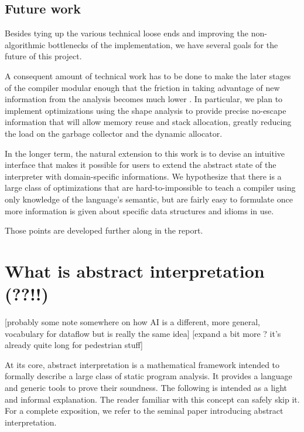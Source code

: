 \documentclass[11pt]{article}
\begin{document}
\subsection*{Future work}

Besides tying up the various technical loose ends and improving the non-algorithmic bottlenecks of the implementation, we have several goals for the future of this project.

A consequent amount of technical work has to be done to make the later stages of the compiler modular enough that the friction in taking advantage of new information from the analysis becomes much lower . In particular, we plan to implement optimizations using the shape analysis to provide precise no-escape information that will allow memory reuse and stack allocation, greatly reducing the load on the garbage collector and the dynamic allocator.

In the longer term, the natural extension to this work is to devise an intuitive interface that makes it possible for users to extend the abstract state of the interpreter with domain-specific informations. We hypothesize that there is a large class of optimizations that are hard-to-impossible to teach a compiler using only knowledge of the language's semantic, but are fairly easy to formulate once more information is given about specific data structures and idioms in use. 

Those points are developed further along in the report.

\break

\section*{What is abstract interpretation (??!!)}

[probably some note somewhere on how AI is a different, more general, vocabulary for dataflow but is really the same idea]
[expand a bit more ? it's already quite long for pedestrian stuff]


At its core, abstract interpretation is a mathematical framework intended to formally describe a large class of static program analysis.
It provides a language and generic tools to prove their soundness.
The following is intended as a light and informal explanation. The reader familiar with this concept can safely skip it. For a complete exposition, we refer to the seminal paper introducing abstract interpretation\cite{absint-cousot}.
\end{document}
